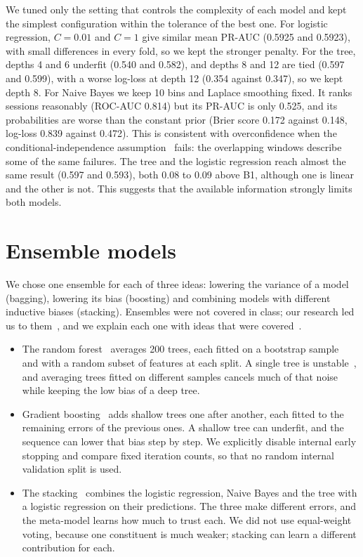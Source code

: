 \documentclass[12pt,a4paper,openany]{report}
\begin{document}
We tuned only the setting that controls the complexity of each model and kept the simplest configuration within
the tolerance of the best one. For logistic regression, $C=0.01$ and $C=1$ give similar mean \acs{PR-AUC}
(0.5925 and 0.5923), with small differences in every fold, so we kept the stronger penalty. For the tree, depths 4 and 6 underfit
(0.540 and 0.582), and depths 8 and 12 are tied (0.597 and 0.599), with a worse log-loss at depth 12 (0.354
against 0.347), so we kept depth 8. For Naive Bayes we keep 10 bins and Laplace smoothing fixed. It ranks sessions reasonably (\acs{ROC-AUC}
0.814) but its \acs{PR-AUC} is only 0.525, and its probabilities are worse than the constant prior (Brier score 0.172
against 0.148, log-loss 0.839 against 0.472). This is consistent with overconfidence when the conditional-independence assumption~\cite{mindd05} fails:
the overlapping windows describe some of the same failures. The tree and the logistic regression reach
almost the same result (0.597 and 0.593), both 0.08 to 0.09 above B1, although one is linear and the other is
not. This suggests that the available information strongly limits both models.

\section{Ensemble models}\label{sec:ensembles}

We chose one ensemble for each of three ideas: lowering the variance of a model (bagging), lowering its bias
(boosting) and combining models with different inductive biases (stacking). Ensembles were not covered in class; our
research led us to them~\cite{breiman2001,friedman2001,wolpert1992}, and we explain each one with ideas that were
covered~\cite{mindd05}.

\begin{itemize}
  \item The random forest~\cite{breiman2001} averages 200 trees, each fitted on a bootstrap sample~\cite{mindd04} and
  with a random subset of features at each split. A single tree is unstable~\cite{mindd05}, and averaging trees fitted on different samples cancels much of that
  noise while keeping the low bias of a deep tree.
  \item Gradient boosting~\cite{friedman2001,sklearn} adds shallow trees one after another, each fitted to the remaining errors of the previous
  ones. A shallow tree can underfit, and the sequence can lower that bias step by step. We explicitly disable
  internal early stopping and compare fixed iteration counts, so that no random internal validation split is used.
  \item The stacking~\cite{wolpert1992} combines the logistic regression, Naive Bayes and the tree with a logistic regression on their
  predictions. The three make different errors, and the meta-model learns how much to trust each. We did not use
  equal-weight voting, because one constituent is much weaker; stacking can learn a different contribution for each.
\end{itemize}
\end{document}
